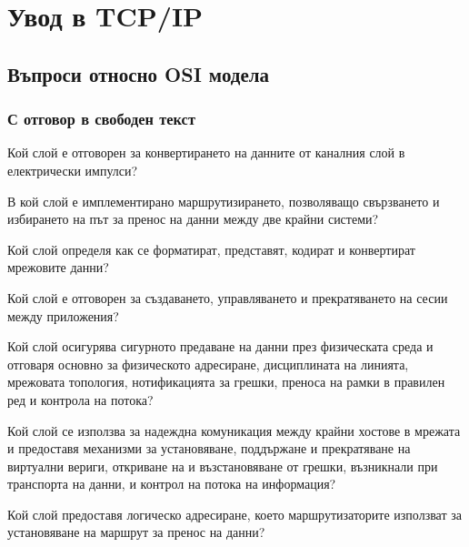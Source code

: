 \section{Увод в TCP/IP}
\subsection{Въпроси относно OSI модела}
\subsubsection{С отговор в свободен текст}
\begin{q}
  Кой слой е отговорен за конвертирането на данните от каналния слой в
  електрически импулси?
\end{q}

\begin{q}
  В кой слой е имплементирано маршрутизирането, позволяващо свързването и
  избирането на път за пренос на данни между две крайни системи?
\end{q}

\begin{q}
  Кой слой определя как се форматират, представят, кодират и конвертират
  мрежовите данни?
\end{q}

\begin{q}
  Кой слой е отговорен за създаването, управляването и прекратяването на сесии
  между приложения?
\end{q}

\begin{q}
  Кой слой осигурява сигурното предаване на данни през физическата среда и
  отговаря основно за физическото адресиране, дисциплината на линията, мрежовата
  топология, нотификацията за грешки, преноса на рамки в правилен ред и контрола
  на потока?
\end{q}

\begin{q}
  Кой слой се използва за надеждна комуникация между крайни хостове в мрежата и
  предоставя механизми за установяване, поддържане и прекратяване на виртуални
  вериги, откриване на и възстановяване от грешки, възникнали при транспорта на
  данни, и контрол на потока на информация?
\end{q}

\begin{q}
  Кой слой предоставя логическо адресиране, което маршрутизаторите използват за
  установяване на маршрут за пренос на данни?
\end{q}

